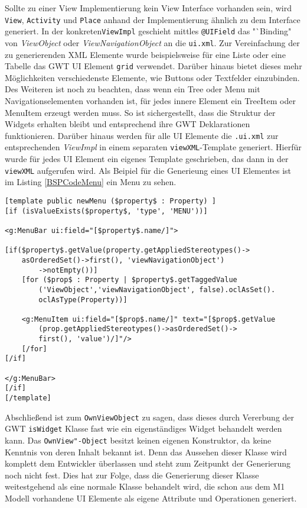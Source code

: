 Sollte zu einer View Implementierung kein View Interface vorhanden sein, wird \texttt{View}, \texttt{Activity} und \texttt{Place} anhand der Implementierung ähnlich zu dem Interface generiert.
In der konkreten\texttt{ViewImpl} geschieht mittles \texttt{@UIField} das "`Binding" von \textit{ViewObject} oder \textit{ViewNavigationObject} an die \texttt{ui.xml}. Zur Vereinfachung der zu generierenden XML Elemente wurde beispielsweise für eine Liste oder eine Tabelle das GWT UI Element \texttt{grid} verwendet. Darüber hinaus bietet dieses mehr Möglichkeiten verschiedenste Elemente, wie Buttons oder Textfelder einzubinden. Des Weiteren ist noch zu beachten, dass wenn ein Tree oder Menu mit Navigationselementen vorhanden ist, für jedes innere Element ein TreeItem oder MenuItem erzeugt werden muss. So ist sichergestellt, dass die Struktur der Widgets erhalten bleibt und entsprechend ihre GWT Deklarationen funktionieren.
Darüber hinaus werden für alle UI Elemente die \texttt{.ui.xml} zur entsprechenden \textit{ViewImpl} in einem separaten \texttt{viewXML}-Template generiert. Hierfür wurde für jedes UI Element ein eigenes Template geschrieben, das dann in der \texttt{viewXML} aufgerufen wird. Als Beipiel für die Generieung eines UI Elementes ist im Listing \ref{BSPCodeMenu} ein Menu zu sehen.
\lstset{language=mtl}
\begin{lstlisting}[caption={Template für die XML - Generierung eines Menus}, label={BSPCodeMenu}]
[template public newMenu ($property$ : Property) ]
[if (isValueExists($property$, 'type', 'MENU'))]

<g:MenuBar ui:field="[$property$.name/]">

[if($property$.getValue(property.getAppliedStereotypes()->
	asOrderedSet()->first(), 'viewNavigationObject')
		->notEmpty())]
	[for ($prop$ : Property | $property$.getTaggedValue
		('ViewObject','viewNavigationObject', false).oclAsSet().
		oclAsType(Property))]

	<g:MenuItem ui:field="[$prop$.name/]" text="[$prop$.getValue
		(prop.getAppliedStereotypes()->asOrderedSet()->
		first(), 'value')/]"/>
	[/for]
[/if]

</g:MenuBar>
[/if]
[/template]
\end{lstlisting}
Abschließend ist zum \texttt{OwnViewObject} zu sagen, dass dieses durch Vererbung der GWT \texttt{isWidget} Klasse fast wie ein eigenständiges Widget behandelt werden kann. Das \texttt{OwnView"-Object} besitzt keinen eigenen Konstruktor, da keine Kenntnis von deren Inhalt bekannt ist. Denn das Aussehen dieser Klasse wird komplett dem Entwickler überlassen und steht zum Zeitpunkt der Generierung noch nicht fest. Dies hat zur Folge, dass die Generierung dieser Klasse weitestgehend als eine normale Klasse behandelt wird, die schon aus dem M1 Modell vorhandene UI Elemente als eigene Attribute und Operationen generiert. 

